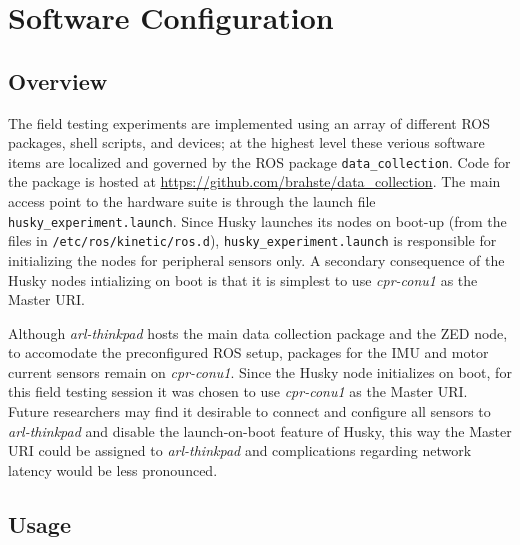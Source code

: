\documentclass[
	12pt, %
]{fphw}
\newcommand{\code}[1]{\colorbox{light-gray}{\texttt{#1}}}
\begin{document}

\section{Software Configuration}
\label{sec:SoftwareConfiguration}

\subsection{Overview}

The field testing experiments are implemented using an array of different ROS packages, shell scripts, and devices; at the highest level these verious software items are localized and governed by the ROS package \code{data\_collection}. Code for the package is hosted at \url{https://github.com/brahste/data_collection}. The main access point to the hardware suite is through the launch file \code{husky\_experiment.launch}. Since Husky launches its nodes on boot-up (from the files in \code{/etc/ros/kinetic/ros.d}), \code{husky\_experiment.launch} is responsible for initializing the nodes for peripheral sensors only. A secondary consequence of the Husky nodes intializing on boot is that it is simplest to use \emph{cpr-conu1} as the Master URI. 

Although \emph{arl-thinkpad} hosts the main data collection package and the ZED node, to accomodate the preconfigured ROS setup, packages for the IMU and motor current sensors remain on \emph{cpr-conu1}. Since the Husky node initializes on boot, for this field testing session it was chosen to use \emph{cpr-conu1} as the Master URI. Future researchers may find it desirable to connect and configure all sensors to \textit{arl-thinkpad} and disable the launch-on-boot feature of Husky, this way the Master URI could be assigned to \textit{arl-thinkpad} and complications regarding network latency would be less pronounced.

\subsection{Usage}
\end{document}
